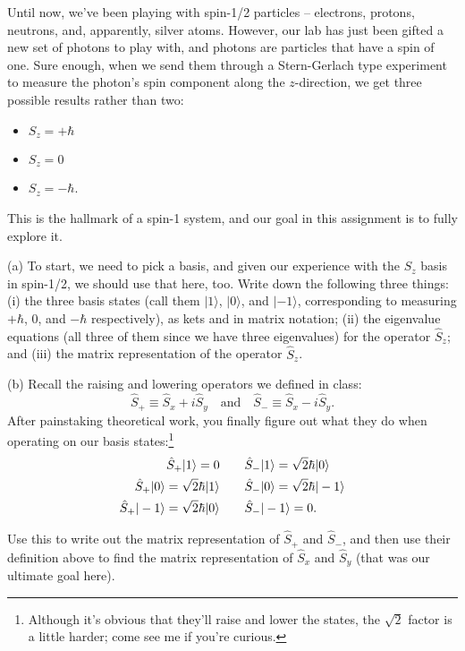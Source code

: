 \begin{problem}[Spin-1]

Until now, we've been playing with spin-1/2 particles -- electrons, protons, neutrons, and, apparently, silver atoms.  However, our lab has just been gifted a new set of photons to play with, and photons are particles that have a spin of one.  Sure enough, when we send them through a Stern-Gerlach type experiment to measure the photon's spin component along the $z$-direction, we get three possible results rather than two:
\begin{itemize}
\item $S_z = +\hbar$
\item $S_z = 0$
\item $S_z = -\hbar$.
\end{itemize}
This is the hallmark of a spin-1 system, and our goal in this assignment is to fully explore it.

(a) To start, we need to pick a basis, and given our experience with the $S_z$ basis in spin-1/2, we should use that here, too.  Write down the following three things:  (i) the three basis states (call them $|1\rangle$, $|0\rangle$, and $|-1\rangle$, corresponding to measuring $+\hbar$, $0$, and $-\hbar$ respectively), as kets and in matrix notation; (ii) the eigenvalue equations (all three of them since we have three eigenvalues) for the operator $\hat{S}_z$; and (iii) the matrix representation of the operator $\hat{S}_z$.

(b) Recall the raising and lowering operators we defined in class:
\[
\hat{S}_+ \equiv \hat{S}_x + i\hat{S}_y \quad \text{and} \quad \hat{S}_- \equiv \hat{S}_x - i\hat{S}_y.
\]
After painstaking theoretical work, you finally figure out what they do when operating on our basis states:\footnote{Although it's obvious that they'll raise and lower the states, the $\sqrt{2}$ factor is a little harder; come see me if you're curious.}
\begin{align*}
\hat{S}_+ | 1 \rangle = 0 \quad & \quad \hat{S}_- | 1 \rangle = \sqrt{2} \hbar | 0 \rangle \\
\hat{S}_+ | 0 \rangle = \sqrt{2} \hbar | 1 \rangle \quad & \quad  \hat{S}_- | 0 \rangle = \sqrt{2} \hbar | -1 \rangle \\
\hat{S}_+ | -1 \rangle = \sqrt{2} \hbar | 0 \rangle \quad & \quad  \hat{S}_- | -1 \rangle = 0.
\end{align*}

Use this to write out the matrix representation of $\hat{S}_+$ and $\hat{S}_-$, and then use their definition above to find the matrix representation of $\hat{S}_x$ and $\hat{S}_y$ (that was our ultimate goal here).


\end{problem}
